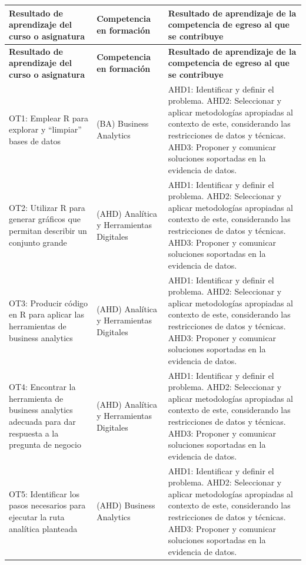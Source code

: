 \documentclass[11pt,a4paper]{article}
\begin{document}
\begin{longtable}{|p{5cm}|p{4cm}|p{6cm}|}
\hline
\textbf{Resultado de aprendizaje del curso o asignatura} & 
\textbf{Competencia en formación} & 
\textbf{Resultado de aprendizaje de la competencia de egreso al que se contribuye} \\
\hline
\endfirsthead

\hline
\textbf{Resultado de aprendizaje del curso o asignatura} & 
\textbf{Competencia en formación} & 
\textbf{Resultado de aprendizaje de la competencia de egreso al que se contribuye} \\
\hline
\endhead

OT1: Emplear R para explorar y ``limpiar'' bases de datos &
(BA) Business Analytics &
AHD1: Identificar y definir el problema. 
AHD2: Seleccionar y aplicar metodologías apropiadas al contexto de este, considerando las restricciones de datos y técnicas. 
AHD3: Proponer y comunicar soluciones soportadas en la evidencia de datos. \\
\hline

OT2: Utilizar R para generar gráficos que permitan describir un conjunto grande &
(AHD) Analítica y Herramientas Digitales &
AHD1: Identificar y definir el problema. 
AHD2: Seleccionar y aplicar metodologías apropiadas al contexto de este, considerando las restricciones de datos y técnicas. 
AHD3: Proponer y comunicar soluciones soportadas en la evidencia de datos. \\
\hline

OT3: Producir código en R para aplicar las herramientas de business analytics &
(AHD) Analítica y Herramientas Digitales &
AHD1: Identificar y definir el problema. 
AHD2: Seleccionar y aplicar metodologías apropiadas al contexto de este, considerando las restricciones de datos y técnicas. 
AHD3: Proponer y comunicar soluciones soportadas en la evidencia de datos. \\
\hline

OT4: Encontrar la herramienta de business analytics adecuada para dar respuesta a la pregunta de negocio &
(AHD) Analítica y Herramientas Digitales &
AHD1: Identificar y definir el problema. 
AHD2: Seleccionar y aplicar metodologías apropiadas al contexto de este, considerando las restricciones de datos y técnicas. 
AHD3: Proponer y comunicar soluciones soportadas en la evidencia de datos. \\
\hline

OT5: Identificar los pasos necesarios para ejecutar la ruta analítica planteada &
(AHD) Business Analytics &
AHD1: Identificar y definir el problema. 
AHD2: Seleccionar y aplicar metodologías apropiadas al contexto de este, considerando las restricciones de datos y técnicas. 
AHD3: Proponer y comunicar soluciones soportadas en la evidencia de datos. \\
\hline


\end{longtable}
\end{document}
